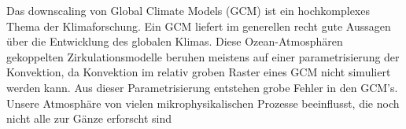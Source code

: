 Das downscaling von Global Climate Models (GCM) ist ein hochkomplexes Thema der Klimaforschung. Ein GCM liefert im generellen recht gute Aussagen über die Entwicklung des globalen Klimas. Diese Ozean-Atmosphären gekoppelten Zirkulationsmodelle beruhen meistens auf einer parametrisierung der Konvektion, da Konvektion im relativ groben Raster eines GCM nicht simuliert werden kann. Aus dieser Parametrisierung entstehen grobe Fehler in den GCM's. \cite[see][Stevens \& Bony]{stevensbony}
Unsere Atmosphäre von vielen mikrophysikalischen Prozesse beeinflusst, die noch nicht alle zur Gänze erforscht sind